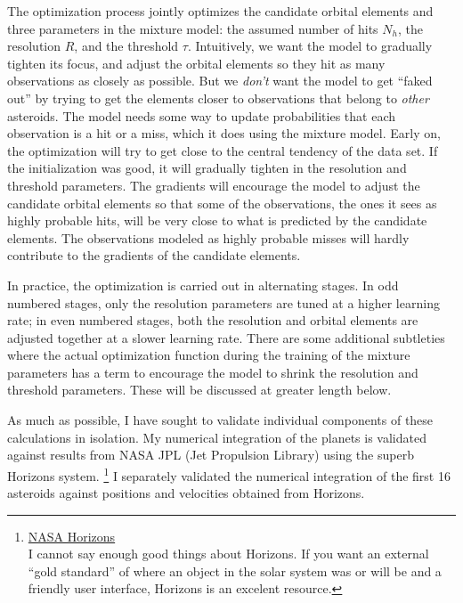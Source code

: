 The optimization process jointly optimizes the candidate orbital elements and three parameters in the mixture model:
the assumed number of hits $N_{h}$, the resolution $R$, and the threshold $\tau$. 
Intuitively, we want the model to gradually tighten its focus, and adjust the orbital elements so they hit as many observations as closely as possible.
But we \textit{don't} want the model to get ``faked out'' by trying to get the elements closer to observations that belong to \textit{other} asteroids.
The model needs some way to update probabilities that each observation is a hit or a miss, which it does using the mixture model.
Early on, the optimization will try to get close to the central tendency of the data set.
If the initialization was good, it will gradually tighten in the resolution and threshold parameters.
The gradients will encourage the model to adjust the candidate orbital elements so that some of the observations,
the ones it sees as highly probable hits, will be very close to what is predicted by the candidate elements.
The observations modeled as highly probable misses will hardly contribute to the gradients of the candidate elements.

In practice, the optimization is carried out in alternating stages.
In odd numbered stages, only the resolution parameters are tuned at a higher learning rate;
in even numbered stages, both the resolution and orbital elements are adjusted together at a slower learning rate.
There are some additional subtleties where the actual optimization function during the training of the mixture
parameters has a term to encourage the model to shrink the resolution and threshold parameters.
These will be discussed at greater length below.

As much as possible, I have sought to validate individual components of these calculations in isolation.
My numerical integration of the planets is validated against results from NASA JPL (Jet Propulsion Library)
using the superb Horizons system.
\footnote{
\href{https://ssd.jpl.nasa.gov/horizons.cgi}{NASA Horizons} \\
I cannot say enough good things about Horizons.
If you want an external ``gold standard'' of where an object in the solar system was or will be 
and a friendly user interface, Horizons is an excelent resource.}
I separately validated the numerical integration of the first 16 asteroids against positions and velocities obtained from Horizons.

